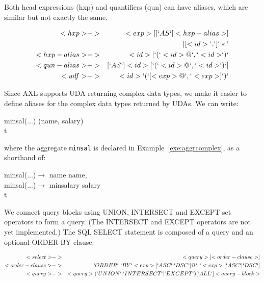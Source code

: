 Both head expressions (hxp) and quantifiers (qun) can have aliases,
which are similar but not exactly the same.

\begin{bnf}
  \begin{eqnarray*}
    <hxp> &->& <exp> [[`AS`] <hxp-alias>]\\
      &&| [<id> `.`] `*`\\
    <hxp-alias> &->& <id> | `(` <id> {@ `,` <id>} `)`\\
    <qun-alias> &->& [`AS`] <id> [`(` <id> {@ `,` <id>} `)`]\\
    <udf> &->& <id> `(` [<exp> {@ `,` <exp>}] `)`\\
  \end{eqnarray*}
\end{bnf}

Since AXL supports UDA returning complex data types, we make it easier
to define aliases for the complex data types returned by UDAs.  We can
write:

\begin{codedisplay}
\>\>\> minsal(...)  (name, salary) \\
\>\>\> t
\end{codedisplay}

where the aggregate {\tt minsal} is declared in
Example~\ref{exe:aggrcomplex}, as a shorthand of:

\begin{codedisplay}
\>\>\>\>\>\>\>minsal(...)$\rightarrow$ name  name,\\
\>\>\>\>\>\>\>minsal(...)$\rightarrow$ minsalary  salary\\
\>\>\> t
\end{codedisplay}

We connect query blocks using UNION, INTERSECT and EXCEPT set
operators to form a query. (The INTERSECT and EXCEPT operators are not
yet implemented.) The SQL SELECT statement is composed of a query and
an optional ORDER BY clause.

\begin{bnf}
  \begin{eqnarray*}
    <select> &->&  <query> [<order-clause>]\\
    <order-clause> &->& `ORDER` \ `BY` <exp> [`ASC`|`DSC`] {@ `,` <exp> [`ASC`|`DSC`] }\\
    <query>  &->& <query> (`UNION`|`INTERSECT`|`EXCEPT`) [`ALL`] <query-block> \\
  \end{eqnarray*}
\end{bnf}

